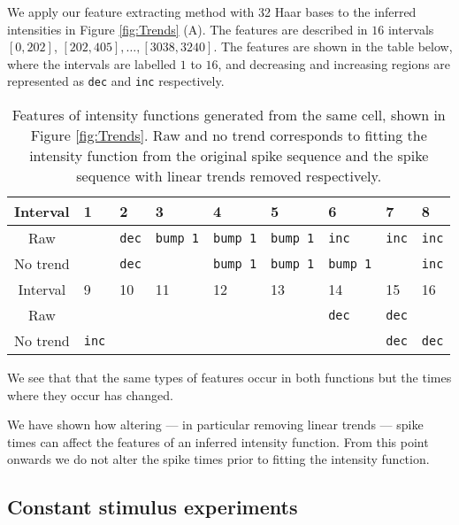 \documentclass[../main.tex]{subfiles}
\begin{document}
  We apply our feature extracting method with 32 Haar bases to the inferred intensities in Figure \ref{fig:Trends} (A). The features are described in $16$ intervals $[0,202]$, $[202,405], \dots, [3038,3240]$. The features are shown in the table below, where the intervals are labelled $1$ to $16$, and decreasing and increasing regions are represented as {\tt dec} and {\tt inc} respectively.
 
 \begin{table}[h!]
  \begin{center}
    \label{table:Haar}
    \begin{tabular}{|c|l|l|l|l|l|l|l|l|}
    \hline
      Interval & 1 & 2 & 3 & 4 & 5 & 6 & 7 & 8 
        \\ 
      \hline
      Raw &  & {\tt dec} & {\tt bump 1} & {\tt bump 1} & {\tt bump 1} & {\tt inc} & {\tt inc} & {\tt inc}   \\
     No trend & & {\tt dec} &  &{\tt  bump 1} & {\tt bump 1} & {\tt bump 1} &  & {\tt inc}  \\ \hline
     \hline
 	Interval & 9 & 10 & 11 & 12 & 13 & 14 & 15 & 16 \\ \hline
 	  Raw   & &  &  &  &  & {\tt dec} & {\tt dec} &   \\
     No trend & {\tt inc} &  &  &  & & & {\tt dec} & {\tt dec}  \\ \hline
    \end{tabular}
    \label{table:feat_with/out_trend}
    \caption{Features of intensity functions generated from the same cell, shown in Figure \ref{fig:Trends}. Raw and no trend corresponds to fitting the intensity function from the original  spike sequence and the spike sequence with linear trends removed respectively.  }
  \end{center}
\end{table} 
We see that that the same types of features occur in both functions but the times where they occur has changed.

We have shown how altering --- in particular removing linear trends ---  spike times  can affect the features of an inferred intensity function. From this point onwards we do not alter the  spike times prior to fitting the intensity function.


\subsection{Constant stimulus experiments}
\end{document}
